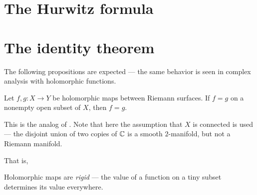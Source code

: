 \section{The Hurwitz formula}


\section{The identity theorem}

The following propositions are expected --- the same behavior is seen in complex analysis with
holomorphic functions.

\begin{theorem}
	Let $f, g \colon X \to Y$ be holomorphic maps between Riemann surfaces. If $f = g$ on a nonempty
	open subset of $X$, then $f = g$.
\end{theorem}
This is the analog of . Note that here the assumption that $X$ is connected
is used --- the disjoint union of two copies of $\mathbb C$ is a smooth $2$-manifold, but not a Riemann
manifold.

That is,
\begin{moral}
	Holomorphic maps are \emph{rigid} --- the value of a function on a tiny subset determines its
	value everywhere.
\end{moral}


